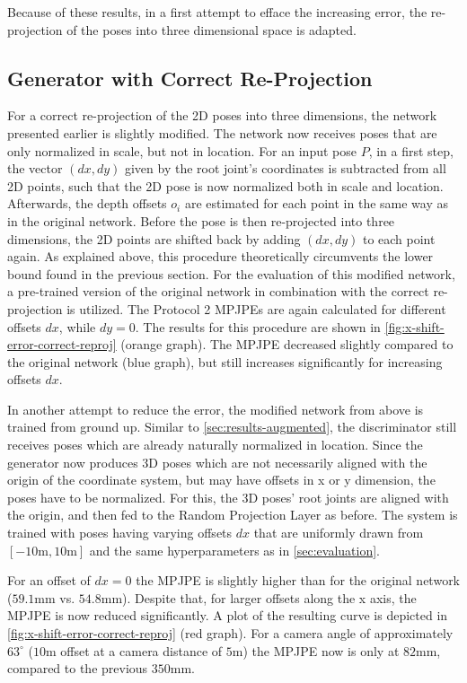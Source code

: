 Because of these results, in a first attempt to efface the increasing error, the re-projection of the poses into three dimensional space is adapted.

\subsection{Generator with Correct Re-Projection}

For a correct re-projection of the 2D poses into three dimensions, the network presented earlier is slightly modified.
The network now receives poses that are only normalized in scale, but not in location.
For an input pose $P$, in a first step, the vector $(dx, dy)$ given by the root joint's coordinates is subtracted from all 2D points, such that the 2D pose is now normalized both in scale and location.
Afterwards, the depth offsets $o_i$ are estimated for each point in the same way as in the original network.
Before the pose is then re-projected into three dimensions, the 2D points are shifted back by adding $(dx, dy)$ to each point again.
As explained above, this procedure theoretically circumvents the lower bound found in the previous section.
For the evaluation of this modified network, a pre-trained version of the original network in combination with the correct re-projection is utilized.
The Protocol 2 MPJPEs are again calculated for different offsets $dx$, while $dy = 0$.
The results for this procedure are shown in \autoref{fig:x-shift-error-correct-reproj} (orange graph).
The MPJPE decreased slightly compared to the original network (blue graph), but still increases significantly for increasing offsets $dx$.

In another attempt to reduce the error, the modified network from above is trained from ground up.
Similar to \autoref{sec:results-augmented}, the discriminator still receives poses which are already naturally normalized in location.
Since the generator now produces 3D poses which are not necessarily aligned with the origin of the coordinate system, but may have offsets in x or y dimension, the poses have to be normalized.
For this, the 3D poses' root joints are aligned with the origin, and then fed to the Random Projection Layer as before.
The system is trained with poses having varying offsets $dx$ that are uniformly drawn from $[-10\text{m}, 10\text{m}]$ and the same hyperparameters as in \autoref{sec:evaluation}.

For an offset of $dx = 0$ the MPJPE is slightly higher than for the original network ($59.1$mm vs. $54.8$mm).
Despite that, for larger offsets along the x axis, the MPJPE is now reduced significantly.
A plot of the resulting curve is depicted in \autoref{fig:x-shift-error-correct-reproj} (red graph).
For a camera angle of approximately $63^{\circ}$ ($10$m offset at a camera distance of $5$m) the MPJPE now is only at $82$mm, compared to the previous $350$mm.

